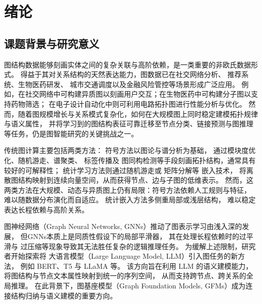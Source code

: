 

\chapter{绪论}

\section{课题背景与研究意义}

图结构数据能够刻画实体之间的复杂关联与高阶依赖，是一类重要的非欧氏数据形式\cite{图结构数据1,图结构数据2}。
得益于其对关系结构的天然表达能力，图数据已在社交网络分析\cite{社交网络分析1,社交网络分析2}、
推荐系统\cite{He2020LightGCNSA,Wang2021LearningIB}、生物医药研发\cite{Guo2022GraphbasedMR,Liu_Wang_Vu_Moretti_Bodenheimer_Meiler_Derr_2023}、
城市交通调度\cite{Zheng2019GMANAG}以及金融风险管控\cite{eFraudCom}等场景形成广泛应用。
例如，在社交网络中可构建异质图以刻画用户交互；在生物医药中可构建分子图以支持药物筛选；
在电子设计自动化中则可利用电路拓扑图进行性能分析与优化\cite{DeepGate}。
然而，随着图规模增长与关系模式复杂化，如何在大规模图上同时稳定建模拓扑规律与语义属性，
并将学习到的图结构表征可靠迁移至节点分类、链接预测与图推理等任务，仍是图智能研究的关键挑战之一。


传统图计算主要包括两类方法：
符号方法以图论与谱分析为基础，
通过模块度优化\cite{Blondel2008FastUO}、随机游走\cite{随机游走}、谱聚类\cite{谱聚类}、
标签传播\cite{标签传播}及
图同构检测\cite{图同构检测}等手段刻画拓扑结构，通常具有较好的可解释性；
统计学习方法则通过随机游走\cite{Perozzi2014DeepWalkOL,Grover2016node2vecSF}或
矩阵分解\cite{Tang2015LINELI,高阶邻接嵌入,有向图高阶传递性嵌入}等
嵌入技术，
将离散图结构映射到连续向量空间，从而获得节点、边与子图的低维表示。
然而，这两类方法在大规模、动态与异质图上仍有局限：符号方法依赖人工规则与特征，
难以随数据分布演化而自适应。
统计嵌入方法多侧重局部或浅层结构，
难以稳定表达长程依赖与高阶关系。

图神经网络（Graph Neural Networks, GNNs）推动了图表示学习由浅入深的发展\cite{1640940046029_929663486}，
但GNNs本质上是同质性假设下的局部平滑器，
其在处理长程依赖时的过平滑\cite{Rusch2023ASO}与
过压缩\cite{Alon2020OnTB}等现象导致其无法胜任复杂的逻辑推理任务。
为缓解上述限制，研究者开始探索将
大语言模型（Large Language Model, LLM）引入图任务的新方法，
例如 BERT\cite{BERT}、T5\cite{T5} 与 LLaMA\cite{Llama} 等。
该方向旨在利用 LLM 的语义建模能力，将图结构与节点文本属性映射到统一的序列空间，
从而支持跨节点、跨关系的全局推理。
在此背景下，图基座模型（Graph Foundation Models, GFMs）成为连接结构归纳与语义建模的重要方向。

